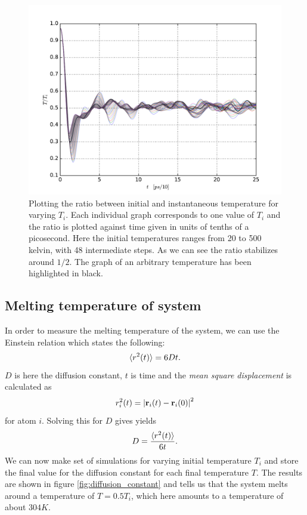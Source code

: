 \documentclass[a4paper]{article}
\renewcommand{\vec}[1]{\mathbf{#1}}
\begin{document}
    \begin{figure}[h]
        \centering \includegraphics[width=\linewidth]{temperature_ratio.pdf}
        \caption[Temperature ratio]{Plotting the ratio between initial and
            instantaneous temperature for varying $T_i$. Each individual graph
            corresponds to one value of $T_i$ and the ratio is plotted against
            time given in units of tenths of a picosecond. Here the initial
            temperatures ranges from 20 to 500 kelvin, with 48 intermediate
            steps.  As we can see the ratio stabilizes around $1/2$. The graph of
            an arbitrary temperature has been highlighted in black.}
        \label{fig:temperature_ratio}
    \end{figure}

\subsection{Melting temperature of system}
\label{sub:melting_temperature_of_system}

    In order to measure the melting temperature of the system, we can use the
    Einstein relation which states the following:
    \begin{equation}
        \notag
        \langle r^2(t) \rangle = 6Dt.
    \end{equation}
    $D$ is here the diffusion constant, $t$ is time and the \emph{mean square
    displacement} is calculated as
    \begin{equation}
        \notag
        r_i^2(t) = \left| \vec{r}_i(t) - \vec{r}_i(0) \right|^2
    \end{equation}
    for atom $i$. Solving this for $D$ gives yields
    \begin{equation}
        \notag
        D = \frac{\langle r^2(t) \rangle}{6t}.
    \end{equation}
    We can now make set of simulations for varying initial temperature $T_i$
    and store the final value for the diffusion constant for each final
    temperature $T$. The results are shown in figure
    \ref{fig:diffusion_constant} and tells us that the system melts around a
    temperature of $T = 0.5T_i$, which here amounts to a temperature of about
    $304K$.
    
\end{document}
